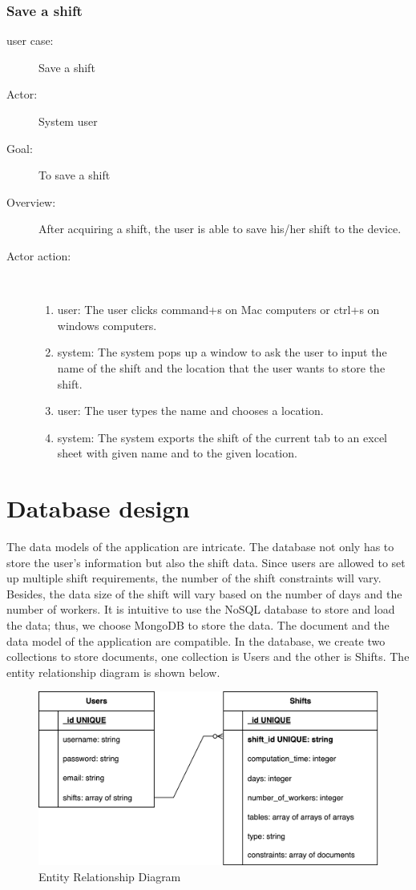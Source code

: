 \documentclass[11pt, oneside]{article}   	%
\begin{document}
\subsubsection{Save a shift}
\begin{description}
\item[user case:] Save a shift
\item[Actor:] System user
\item[Goal:] To save a shift
\item[Overview:]After acquiring a shift, the user is able to save his/her shift to the device.
\item[Actor action:]
\
\begin{enumerate}
\item user: The user clicks command+s on Mac computers or ctrl+s on windows computers.
\item system: The system pops up a window to ask the user to input the name of the shift and the location that the user wants to store the shift.
\item user: The user types the name and chooses a location.
\item system: The system exports the shift of the current tab to an excel sheet with given name and to the given location.
\end{enumerate}
\end{description}

\section{Database design}
The data models of the application are intricate. The database not only has to store the user’s information but also the shift data. Since users are allowed to set up multiple shift requirements, the number of the shift constraints will vary. Besides, the data size of the shift will vary based on the number of days and the number of  workers. It is intuitive to use the NoSQL database to store and load the data; thus, we choose MongoDB to store the data. The document and the data model of the application are compatible. In the database, we create two collections to store documents, one collection is Users and the other is Shifts. The entity relationship diagram is shown below.


\begin{figure}[h]
\centering
\includegraphics[width=\textwidth]{ erd }
\caption{Entity Relationship Diagram}
\label{erd}
\end{figure}
\end{document}
